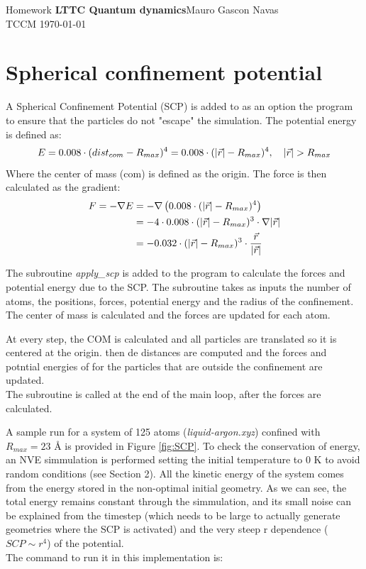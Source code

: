 \documentclass{cis320}
\begin{document}
\noindent Homework \textbf{LTTC Quantum dynamics}\hfill  Mauro Gascon Navas\\
TCCM \today

\hrulefill

\section{Spherical confinement potential}

A Spherical Confinement Potential (SCP) is added to as an option the program to ensure that the particles do not "escape" the simulation. The potential energy is defined as:
\[
E = 0.008 \cdot (dist_{com}-R_{max})^4 = 0.008 \cdot (\abs{\vec{r}}-R_{max})^4, \quad \abs{\vec{r}} > R_{max} 
\]
Where the center of mass (com) is defined as the origin. The force is then calculated as the gradient:
\[
\begin{aligned}
F = -\nabla E &= -\nabla \left( 0.008 \cdot (\abs{\vec{r}}-R_{max})^4 \right) \\
&= -4 \cdot 0.008 \cdot (\abs{\vec{r}}-R_{max})^3 \cdot \nabla \abs{\vec{r}} \\
&=-0.032 \cdot (\abs{\vec{r}}-R_{max})^3 \cdot \frac{\vec{r}}{\abs{\vec{r}}}
\end{aligned}
\]

The subroutine \textit{apply\_scp} is added to the program to calculate the forces and potential energy due to the SCP. The subroutine takes as inputs the number of atoms, the positions, forces, potential energy and the radius of the confinement. The center of mass is calculated and the forces are updated for each atom.\\
\par
At every step, the COM is calculated and all particles are translated so it is centered at the origin. then de distances are computed and the forces and potntial energies of for the particles that are outside the confinement are updated.\\
The subroutine is called at the end of the main loop, after the forces are calculated.\\
\par
A sample run for a system of 125 atoms (\textit{liquid-argon.xyz}) confined with $R_{max}=23$ \r{A} is  provided in Figure \ref{fig:SCP}. To check the conservation of energy, an NVE simmulation is performed setting the initial temperature to 0 K to avoid random conditions (see Section 2). All the kinetic energy of the system comes from the energy stored in the non-optimal initial geometry. As we can see, the total energy remains constant through the simmulation, and its small noise can be explained from the timestep (which needs to be large to actually generate geometries where the SCP is activated) and the very steep r dependence ($SCP \sim r^4$) of the potential. \\
The command to run it in this implementation is:
\end{document}
